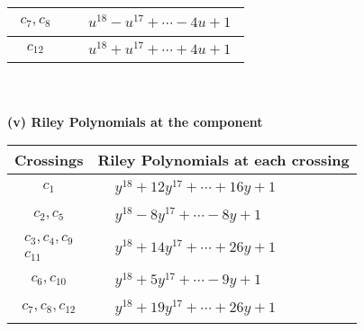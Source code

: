\documentclass[1p]{elsarticle_modified}
\theoremstyle{definition}
\begin{document}
\begin{tabular}{m{50pt}|m{274pt}}
\hline $$\begin{aligned}c_{7},c_{8}\end{aligned}$$&$\begin{aligned}
&u^{18}- u^{17}+\cdots-4 u+1
\end{aligned}$\\
\hline $$\begin{aligned}c_{12}\end{aligned}$$&$\begin{aligned}
&u^{18}+u^{17}+\cdots+4 u+1
\end{aligned}$\\
\hline
\end{tabular}\\~\\
\newpage\renewcommand{\arraystretch}{1}
\flushleft \textbf{(v) Riley Polynomials at the component}\newline \\
\begin{tabular}{m{50pt}|m{274pt}}
Crossings & \hspace{64pt}Riley Polynomials at each crossing \\
\hline $$\begin{aligned}c_{1}\end{aligned}$$&$\begin{aligned}
&y^{18}+12 y^{17}+\cdots+16 y+1
\end{aligned}$\\
\hline $$\begin{aligned}c_{2},c_{5}\end{aligned}$$&$\begin{aligned}
&y^{18}-8 y^{17}+\cdots-8 y+1
\end{aligned}$\\
\hline $$\begin{aligned}c_{3},c_{4},c_{9}\\c_{11}\end{aligned}$$&$\begin{aligned}
&y^{18}+14 y^{17}+\cdots+26 y+1
\end{aligned}$\\
\hline $$\begin{aligned}c_{6},c_{10}\end{aligned}$$&$\begin{aligned}
&y^{18}+5 y^{17}+\cdots-9 y+1
\end{aligned}$\\
\hline $$\begin{aligned}c_{7},c_{8},c_{12}\end{aligned}$$&$\begin{aligned}
&y^{18}+19 y^{17}+\cdots+26 y+1
\end{aligned}$\\
\hline
\end{tabular}\\~\\
\end{document}
